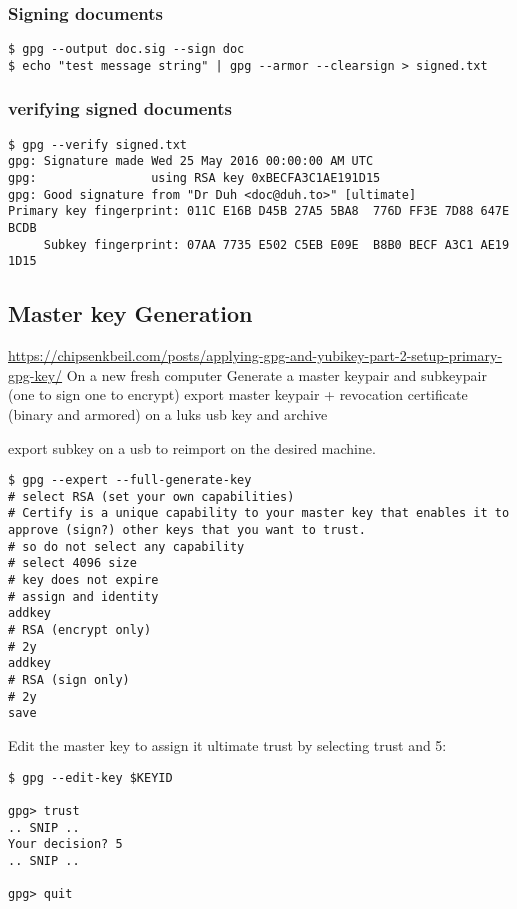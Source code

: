 \subsubsection{Signing  documents}
\begin{verbatim}
$ gpg --output doc.sig --sign doc
$ echo "test message string" | gpg --armor --clearsign > signed.txt
\end{verbatim}

\subsubsection{verifying signed documents}
\begin{verbatim}
$ gpg --verify signed.txt
gpg: Signature made Wed 25 May 2016 00:00:00 AM UTC
gpg:                using RSA key 0xBECFA3C1AE191D15
gpg: Good signature from "Dr Duh <doc@duh.to>" [ultimate]
Primary key fingerprint: 011C E16B D45B 27A5 5BA8  776D FF3E 7D88 647E BCDB
     Subkey fingerprint: 07AA 7735 E502 C5EB E09E  B8B0 BECF A3C1 AE19 1D15
\end{verbatim}

\subsection{Master key Generation}

\url{https://chipsenkbeil.com/posts/applying-gpg-and-yubikey-part-2-setup-primary-gpg-key/}
On a new fresh computer 
Generate a master keypair and subkeypair (one to sign one to encrypt)
export master keypair + revocation certificate (binary and armored) on a luks
usb key and archive

export subkey on a usb to reimport on the desired machine.

\begin{verbatim}
$ gpg --expert --full-generate-key
# select RSA (set your own capabilities)
# Certify is a unique capability to your master key that enables it to approve (sign?) other keys that you want to trust. 
# so do not select any capability
# select 4096 size
# key does not expire
# assign and identity
addkey 
# RSA (encrypt only)
# 2y
addkey 
# RSA (sign only)
# 2y
save
\end{verbatim}

Edit the master key to assign it ultimate trust by selecting trust and 5:

\begin{verbatim}
$ gpg --edit-key $KEYID

gpg> trust
.. SNIP ..
Your decision? 5
.. SNIP ..

gpg> quit
\end{verbatim}

